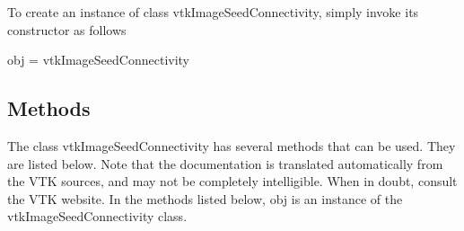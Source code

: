 To create an instance of class vtk\-Image\-Seed\-Connectivity, simply invoke its constructor as follows \begin{DoxyVerb}  obj = vtkImageSeedConnectivity
\end{DoxyVerb}
 \hypertarget{vtkwidgets_vtkxyplotwidget_Methods}{}\subsection{Methods}\label{vtkwidgets_vtkxyplotwidget_Methods}
The class vtk\-Image\-Seed\-Connectivity has several methods that can be used. They are listed below. Note that the documentation is translated automatically from the V\-T\-K sources, and may not be completely intelligible. When in doubt, consult the V\-T\-K website. In the methods listed below, {\ttfamily obj} is an instance of the vtk\-Image\-Seed\-Connectivity class. 

